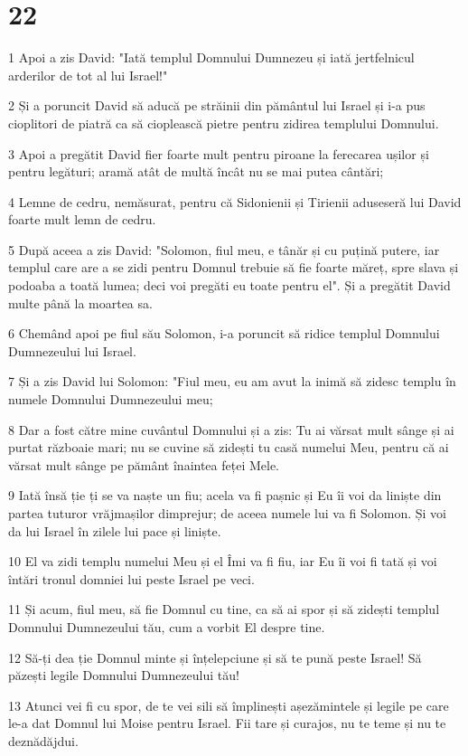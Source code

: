 \chapter{22}

\par 1 Apoi a zis David: "Iată templul Domnului Dumnezeu și iată jertfelnicul arderilor de tot al lui Israel!"
\par 2 Și a poruncit David să aducă pe străinii din pământul lui Israel și i-a pus cioplitori de piatră ca să cioplească pietre pentru zidirea templului Domnului.
\par 3 Apoi a pregătit David fier foarte mult pentru piroane la ferecarea ușilor și pentru legături; aramă atât de multă încât nu se mai putea cântări;
\par 4 Lemne de cedru, nemăsurat, pentru că Sidonienii și Tirienii aduseseră lui David foarte mult lemn de cedru.
\par 5 După aceea a zis David: "Solomon, fiul meu, e tânăr și cu puțină putere, iar templul care are a se zidi pentru Domnul trebuie să fie foarte măreț, spre slava și podoaba a toată lumea; deci voi pregăti eu toate pentru el". Și a pregătit David multe până la moartea sa.
\par 6 Chemând apoi pe fiul său Solomon, i-a poruncit să ridice templul Domnului Dumnezeului lui Israel.
\par 7 Și a zis David lui Solomon: "Fiul meu, eu am avut la inimă să zidesc templu în numele Domnului Dumnezeului meu;
\par 8 Dar a fost către mine cuvântul Domnului și a zis: Tu ai vărsat mult sânge și ai purtat războaie mari; nu se cuvine să zidești tu casă numelui Meu, pentru că ai vărsat mult sânge pe pământ înaintea feței Mele.
\par 9 Iată însă ție ți se va naște un fiu; acela va fi pașnic și Eu îi voi da liniște din partea tuturor vrăjmașilor dimprejur; de aceea numele lui va fi Solomon. Și voi da lui Israel în zilele lui pace și liniște.
\par 10 El va zidi templu numelui Meu și el Îmi va fi fiu, iar Eu îi voi fi tată și voi întări tronul domniei lui peste Israel pe veci.
\par 11 Și acum, fiul meu, să fie Domnul cu tine, ca să ai spor și să zidești templul Domnului Dumnezeului tău, cum a vorbit El despre tine.
\par 12 Să-ți dea ție Domnul minte și înțelepciune și să te pună peste Israel! Să păzești legile Domnului Dumnezeului tău!
\par 13 Atunci vei fi cu spor, de te vei sili să împlinești așezămintele și legile pe care le-a dat Domnul lui Moise pentru Israel. Fii tare și curajos, nu te teme și nu te deznădăjdui.
